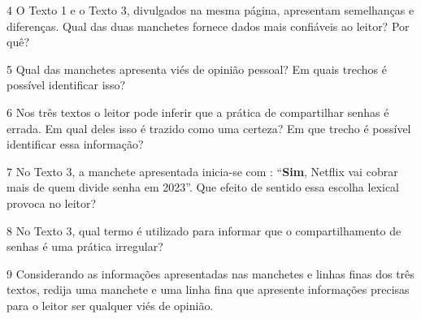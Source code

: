 {\num{4} O Texto 1 e o Texto 3, divulgados na mesma página, apresentam
semelhanças e diferenças. Qual das duas manchetes fornece dados mais
confiáveis ao leitor? Por quê?



\num{5} Qual das manchetes apresenta viés de opinião pessoal? Em quais
trechos é possível identificar isso?



\num{6} Nos três textos o leitor pode inferir que a prática de
compartilhar senhas é errada. Em qual deles isso é trazido como uma
certeza? Em que trecho é possível identificar essa informação?



\num{7} No Texto 3, a manchete apresentada inicia-se com :
``\textbf{Sim}, Netflix vai cobrar mais de quem divide senha em 2023''.
Que efeito de sentido essa escolha lexical provoca no leitor?



\num{8} No Texto 3, qual termo é utilizado para informar que o
compartilhamento de senhas é uma prática irregular?



\num{9} Considerando as informações apresentadas nas manchetes e linhas
finas dos três textos, redija uma manchete e uma linha fina que
apresente informações precisas para o leitor ser qualquer viés de
opinião.

}

